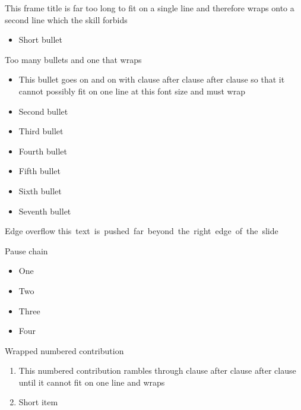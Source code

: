\documentclass[11pt, aspectratio=169]{beamer}
\begin{document}
\begin{frame}{This frame title is far too long to fit on a single line and therefore wraps onto a second line which the skill forbids}
  \begin{itemize}
    \item Short bullet
  \end{itemize}
\end{frame}

\begin{frame}{Too many bullets and one that wraps}
  \begin{itemize}
    \item This bullet goes on and on with clause after clause after clause so that it cannot possibly fit on one line at this font size and must wrap
    \item Second bullet
    \item Third bullet
    \item Fourth bullet
    \item Fifth bullet
    \item Sixth bullet
    \item Seventh bullet
  \end{itemize}
\end{frame}

\begin{frame}{Edge overflow}
  \noindent\hspace{0.8\textwidth}\mbox{this text is pushed far beyond the right edge of the slide}
\end{frame}

\begin{frame}{Pause chain}
  \begin{itemize}
    \item One \pause
    \item Two \pause
    \item Three \pause
    \item Four
  \end{itemize}
\end{frame}

\begin{frame}{Wrapped numbered contribution}
  \begin{enumerate}
    \item This numbered contribution rambles through clause after clause after clause until it cannot fit on one line and wraps
    \item Short item
  \end{enumerate}
\end{frame}
\end{document}

